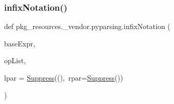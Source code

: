 \subsubsection{\texorpdfstring{infix\+Notation()}{infixNotation()}}
{\footnotesize\ttfamily def pkg\+\_\+resources.\+\_\+vendor.\+pyparsing.\+infix\+Notation (\begin{DoxyParamCaption}\item[{}]{base\+Expr,  }\item[{}]{op\+List,  }\item[{}]{lpar = {\ttfamily \hyperlink{classpkg__resources_1_1__vendor_1_1pyparsing_1_1Suppress}{Suppress}(\textquotesingle{}(\textquotesingle{}),~rpar=\hyperlink{classpkg__resources_1_1__vendor_1_1pyparsing_1_1Suppress}{Suppress}(\textquotesingle{})\textquotesingle{})} }\end{DoxyParamCaption})}


